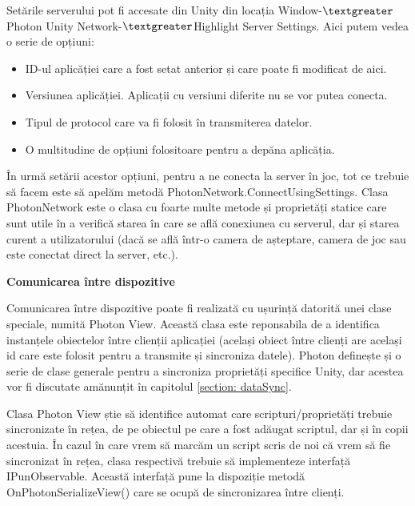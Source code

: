 \documentclass[12pt, a4paper]{article}
\begin{document}
	Setările serverului pot fi accesate din Unity din locația Window-$\textgreater$Photon Unity Network-$\textgreater$Highlight Server Settings. Aici putem vedea o serie de opțiuni:
	
	\begin{itemize}
		\item ID-ul aplicăției care a fost setat anterior și care poate fi modificat de aici.
		\item Versiunea aplicăției. Aplicații cu versiuni diferite nu se vor putea conecta.
		\item Tipul de protocol care va fi folosit în transmiterea datelor.
		\item O multitudine de opțiuni folositoare pentru a depăna aplicăția.
	\end{itemize}
	
	În urmă setării acestor opțiuni, pentru a ne conecta la server în joc, tot ce trebuie să facem este să apelăm metodă PhotonNetwork.ConnectUsingSettings. Clasa PhotonNetwork este o clasa cu foarte multe metode și proprietăți statice care sunt utile în a verifică starea în care se află conexiunea cu serverul, dar și starea curent a utilizatorului (dacă se află într-o camera de așteptare, camera de joc sau este conectat direct la server, etc.).
	\newline
	

	
	
	\textbf{Comunicarea între dispozitive}
	\newline
	
	Comunicarea între dispozitive poate fi realizată cu ușurință datorită unei clase speciale, numită Photon View. Această clasa este reponsabila de a identifica instanțele obiectelor între clienții aplicației (același obiect între clienți are același id care este folosit pentru a transmite și sincroniza datele). Photon definește și o serie de clase generale pentru a sincroniza proprietăți specifice Unity, dar acestea vor fi discutate amănunțit în capitolul \ref{section: dataSync}.
	\newline
	
	Clasa Photon View știe să identifice automat care scripturi/proprietăți trebuie sincronizate în rețea, de pe obiectul pe care a fost adăugat scriptul, dar și în copii acestuia. În cazul în care vrem să marcăm un script scris de noi că vrem să fie sincronizat în rețea, clasa respectivă trebuie să implementeze interfață IPunObservable. Această interfață pune la dispoziție metodă OnPhotonSerializeView() care se ocupă de sincronizarea între clienți.
	\newline
	
\end{document}
